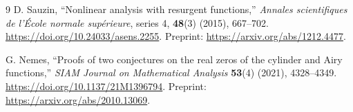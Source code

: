 \documentclass[11pt,a4paper]{article}
\theoremstyle{definition}
\numberwithin{equation}{section}
\begin{document}
\begin{thebibliography}{9}
D. Sauzin, ``Nonlinear analysis with resurgent functions,''
\emph{Annales scientifiques de l'\'Ecole normale sup\'erieure}, series 4,
\textbf{48}(3) (2015), 667--702.
\url{https://doi.org/10.24033/asens.2255}.
Preprint: \url{https://arxiv.org/abs/1212.4477}.

G. Nemes, ``Proofs of two conjectures on the real zeros of the cylinder and Airy functions,''
\emph{SIAM Journal on Mathematical Analysis} \textbf{53}(4) (2021), 4328--4349.
\url{https://doi.org/10.1137/21M1396794}.
Preprint: \url{https://arxiv.org/abs/2010.13069}.

\end{thebibliography}
\end{document}
